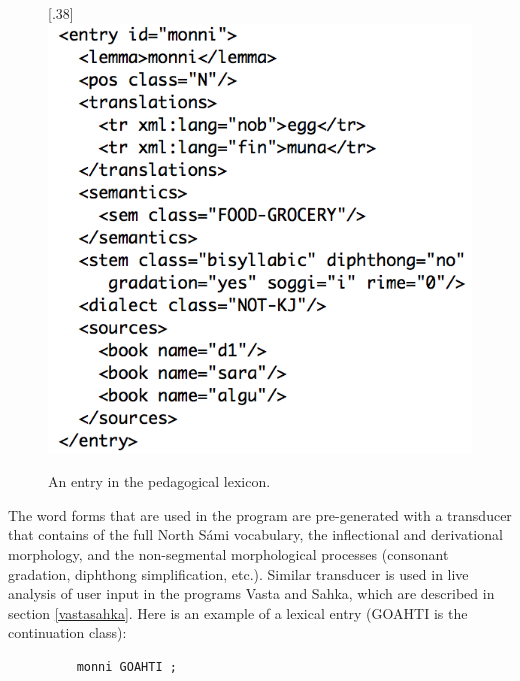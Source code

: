 \documentclass[11pt]{article}
\begin{document}
\begin{figure}[tbp]
\begin{center}
\scalebox{.38}[.38]{\includegraphics{presentation/img/nounlexicon4.png}}\\
\caption{An entry in the pedagogical lexicon.}
\label{nounlex}
\end{center}
\end{figure}


The word forms that are used in the program are pre-generated with a transducer that contains of the full North Sámi vocabulary, the inflectional and derivational morphology, and the non-segmental morphological processes (consonant gradation, diphthong simplification, etc.). Similar transducer is used in live analysis of user input in the programs Vasta and Sahka, which are described in section \ref{vastasahka}. Here is an example of a lexical entry (GOAHTI is the continuation class):

\begin{figure}[htbp]
\begin{center}
\begin{verbatim}
    monni GOAHTI ;
\end{verbatim}
\label{nounsmelex}
\end{center}
\end{figure}
\end{document}
